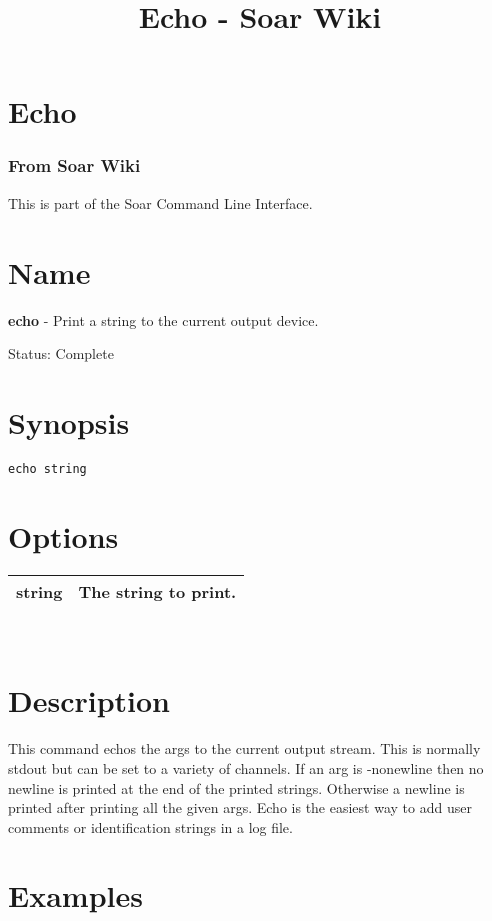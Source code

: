 \documentclass[10pt]{article}
\title{Echo - Soar Wiki}
\begin{document}
\section*{Echo}
\subsubsection*{From Soar Wiki}


 This is part of the Soar Command Line Interface. 
\section*{ Name }


 \textbf{echo}
 - Print a string to the current output device. 


 Status: Complete
\section*{ Synopsis }
\begin{verbatim}
echo string

\end{verbatim}
\section*{ Options }


\begin{tabular}{|p{1in}|p{5in}|}
\hline 
 string  & The string to print.  \\
 \hline 

\end{tabular}



 \\ 

\section*{ Description }


 This command echos the args to the current output stream. This is normally stdout but can be set to a variety of channels. If an arg is -nonewline then no newline is printed at the end of the printed strings. Otherwise a newline is printed after printing all the given args. Echo is the easiest way to add user comments or identification strings in a log file. 
\section*{ Examples }
\end{document}
